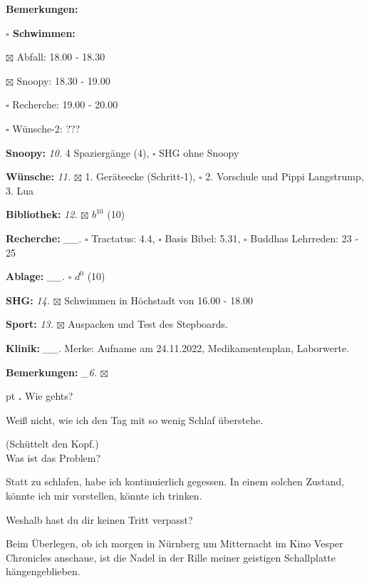 \documentclass[10pt,a4paper]{article}
\newcounter{notec}
\newcommand\notep[1]{%
  \stepcounter{notec}
  \vskip #1pt
  {\bf\arabic{notec}.}
}
\newcommand\prop[1] {{\color {alizarin} {\bf #1}}}             %
\newcommand\opti[1] {{\color {amethyst} {\bf #1}}}             %
\newcommand\mand[1] {{\color {burntorange} {\bf #1}}}          %
\newcommand\bottomspace{\vskip 4pt}
\newcommand\n[1] { {\sl #1.} \hskip 5pt }
\begin{document}
\begin{mdframed}[style=daystyle]
\begin{labeling}{{\mand {Bemerkungen:}}}
\begin{minipage}{0.75\textwidth}
\begin{labeling}{\prop {$\square$ {Schwimmen:}}}
      \item[$\boxtimes$ Abfall:]     18.00 - 18.30
      \item[$\boxtimes$ Snoopy:]     18.30 - 19.00
      \item[$\square$ Recherche:]    19.00 - 20.00
      \item[$\square$ Wünsche-2:]    ???
      \end{labeling}
    \end{minipage}
    \bottomspace
  \item[{\mand {Snoopy:}}]         \n{10} 4 Spaziergänge (4), $\square$ SHG ohne Snoopy
  \item[{\mand {Wünsche:}}]        \n{11} $\boxtimes$ 1. Geräteecke (Schritt-1),
      $\square$ 2. Vorschule und Pippi Langstrump, 3. Lua
  \item[{\mand {Bibliothek:}}]     \n{12} $\boxtimes$ $b^{10}$ (10)
  \item[{\mand {Recherche:}}]    \n{\_\_} $\square$ Tractatus: 4.4, $\square$ Basis Bibel: 5.31,
      $\square$ Buddhas Lehrreden: 23 - 25
  \item[{\mand {Ablage:}}]       \n{\_\_} $\square$ $d^{0}$ (10)
  \item[{\mand {SHG:}}]            \n{14} $\boxtimes$ Schwimmen in Höchstadt von 16.00 - 18.00
  \item[{\opti {Sport:}}]          \n{13} $\boxtimes$ Auspacken und Test des Stepboards.
  \item[{\opti {Klinik:}}]       \n{\_\_} Merke: Aufname am 24.11.2022, Medikamentenplan, Laborwerte.
  \item[{\mand {Bemerkungen:}}]   \n{\_6} $\boxtimes$
  \end{labeling}
    
  \setcounter{notec}{0}
  
  \notep 0 Wie gehts?

  \vskip 2pt
  Weiß nicht, wie ich den Tag mit so wenig Schlaf überstehe.

  \vskip 2pt
  (Schüttelt den Kopf.) \\
  Was ist das Problem?

  \vskip 2pt
  Statt zu schlafen, habe ich kontinuierlich gegessen. In einem solchen Zustand,
  könnte ich mir vorstellen, könnte ich trinken.

  \vskip 2pt
  Weshalb hast du dir keinen Tritt verpasst?

  \vskip 2pt
  Beim Überlegen, ob ich morgen in Nürnberg um Mitternacht im Kino Vesper
  Chronicles anschaue, ist die Nadel in der Rille meiner geistigen Schallplatte
  hängengeblieben.


\end{mdframed}
\end{document}
